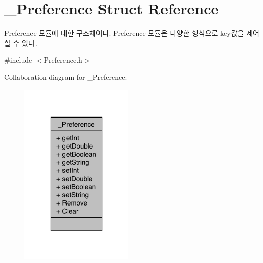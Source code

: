 \hypertarget{struct__Preference}{\section{\-\_\-\-Preference Struct Reference}
\label{struct__Preference}
}


Preference 모듈에 대한 구조체이다. Preference 모듈은 다양한 형식으로 key값을 제어 할 수 있다.  




{\ttfamily \#include $<$Preference.\-h$>$}



Collaboration diagram for \-\_\-\-Preference\-:\nopagebreak
\begin{figure}[H]
\begin{center}
\leavevmode
\includegraphics[width=154pt]{d5/d04/struct__Preference__coll__graph}
\end{center}
\end{figure}
